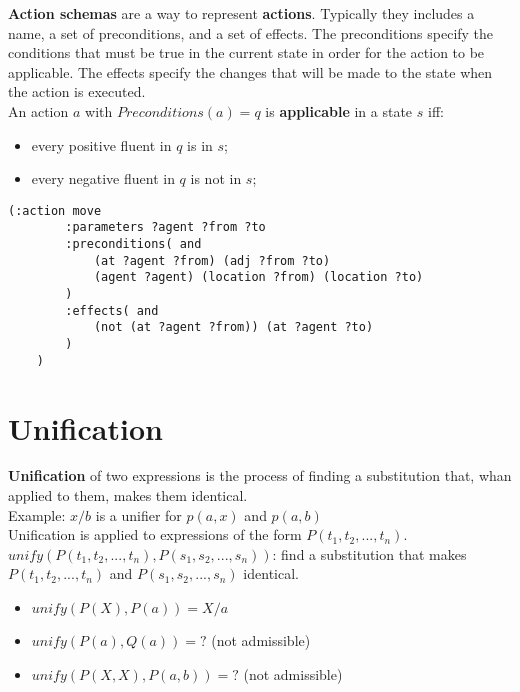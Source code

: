 \documentclass{article}
\begin{document}
\textbf{Action schemas} are a way to represent \textbf{actions}. Typically they includes a name, a set of preconditions, and a set of effects. The preconditions specify the conditions that must be true in the current state in order for the action to be applicable. The effects specify the changes that will be made to the state when the action is executed. \\

An action $a$ with $Preconditions(a) = q$ is \textbf{applicable} in a state $s$ iff:

\begin{itemize}
    \item every positive fluent in $q$ is in $s$;
    \item every negative fluent in $q$ is not in $s$;
\end{itemize}

\vspace{2cm}

\begin{lstlisting}[language=PDDL]
    (:action move
        :parameters ?agent ?from ?to
        :preconditions( and
            (at ?agent ?from) (adj ?from ?to)
            (agent ?agent) (location ?from) (location ?to)
        )
        :effects( and
            (not (at ?agent ?from)) (at ?agent ?to)
        )
    )
\end{lstlisting}

\newpage

\section{Unification}

\textbf{Unification} of two expressions is the process of finding a substitution that, whan applied to them, makes them identical.\\

Example: ${x/b}$ is a unifier for $p(a, x)$ and $p(a, b)$ \\

Unification is applied to expressions of the form $P(t_1, t_2, ..., t_n)$. \\
$unify(P(t_1, t_2, ..., t_n), P(s_1, s_2, ..., s_n))$: find a substitution that makes $P(t_1, t_2, ..., t_n)$ and $P(s_1, s_2, ..., s_n)$ identical.

\begin{itemize}
    \item $unify(P(X), P(a)) = {X/a}$
    \item $unify(P(a), Q(a)) = ?$ (not admissible)
    \item $unify(P(X,X), P(a, b)) = ?$ (not admissible)
\end{itemize}
\end{document}
